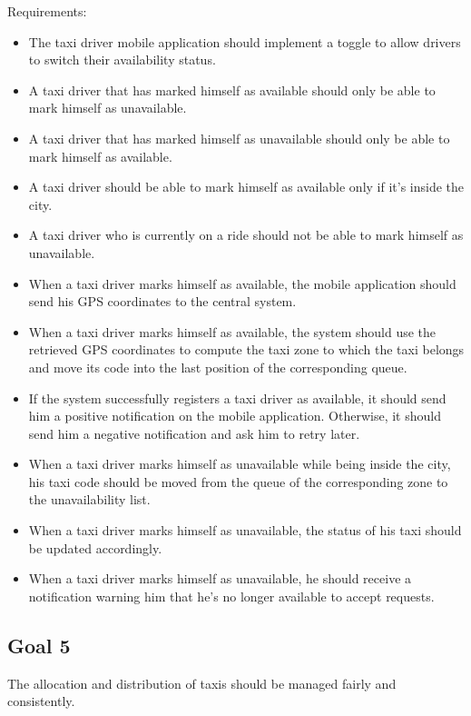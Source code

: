 Requirements:
\begin{itemize}
\item The taxi driver mobile application should implement a toggle to allow drivers to switch their availability status.
\item A taxi driver that has marked himself as available should only be able to mark himself as unavailable. 
\item A taxi driver that has marked himself as unavailable should only be able to mark himself as available.
\item A taxi driver should be able to mark himself as available only if it's inside the city.
\item A taxi driver who is currently on a ride should not be able to mark himself as unavailable.
\item When a taxi driver marks himself as available, the mobile application should send his GPS coordinates to the central system.
\item When a taxi driver marks himself as available, the system should use the retrieved GPS coordinates to compute the taxi zone to which the taxi belongs and move its code into the last position of the corresponding queue.
\item If the system successfully registers a taxi driver as available, it should send him a positive notification on the mobile application. Otherwise, it should send him a negative notification and ask him to retry later.
\item When a taxi driver marks himself as unavailable while being inside the city, his taxi code should be moved from the queue of the corresponding zone to the unavailability list.
\item When a taxi driver marks himself as unavailable, the status of his taxi should be updated accordingly. 
\item When a taxi driver marks himself as unavailable, he should receive a notification warning him that he's no longer available to accept requests.
\end{itemize}


\subsection{Goal 5}
The allocation and distribution of taxis should be managed fairly and consistently.

